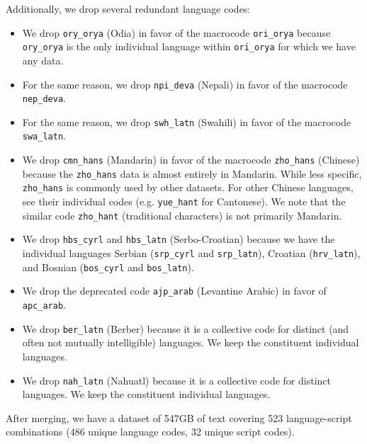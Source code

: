\documentclass[11pt]{article}
\begin{document}
Additionally, we drop several redundant language codes:
\begin{itemize}[leftmargin=0.5cm,itemsep=0.0cm,topsep=0.1cm]
\item We drop \texttt{ory\_orya} (Odia) in favor of the macrocode \texttt{ori\_orya} because \texttt{ory\_orya} is the only individual language within \texttt{ori\_orya} for which we have any data.
\item For the same reason, we drop \texttt{npi\_deva} (Nepali) in favor of the macrocode \texttt{nep\_deva}.
\item For the same reason, we drop \texttt{swh\_latn} (Swahili) in favor of the macrocode \texttt{swa\_latn}.
\item We drop \texttt{cmn\_hans} (Mandarin) in favor of the macrocode \texttt{zho\_hans} (Chinese) because the \texttt{zho\_hans} data is almost entirely in Mandarin. While less specific, \texttt{zho\_hans} is commonly used by other datasets.
For other Chinese languages, see their individual codes (e.g. \texttt{yue\_hant} for Cantonese).
We note that the similar code \texttt{zho\_hant} (traditional characters) is not primarily Mandarin.
\item We drop \texttt{hbs\_cyrl} and \texttt{hbs\_latn} (Serbo-Croatian) because we have the individual languages Serbian (\texttt{srp\_cyrl} and \texttt{srp\_latn}), Croatian (\texttt{hrv\_latn}), and Bosnian (\texttt{bos\_cyrl} and \texttt{bos\_latn}).
\item We drop the deprecated code \texttt{ajp\_arab} (Levantine Arabic) in favor of \texttt{apc\_arab}.
\item We drop \texttt{ber\_latn} (Berber) because it is a collective code for distinct (and often not mutually intelligible) languages. We keep the constituent individual languages.
\item We drop \texttt{nah\_latn} (Nahuatl) because it is a collective code for distinct languages. We keep the constituent individual languages.
\end{itemize}
After merging, we have a dataset of 547GB of text covering 523 language-script combinations (486 unique language codes, 32 unique script codes).
\end{document}
